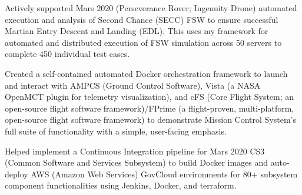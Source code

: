 \documentclass[8pt]{article}
\newenvironment{outerlist}[1][\enskip\textbullet]%
       {\begin{compactenum}[#1]}{\end{compactenum}%
        \vspace{-.3\baselineskip}}
\newenvironment{innerlist}[1][\enskip\textbullet]%
        {\begin{compactenum}[#1]}{\end{compactenum}}
\begin{document}
\begin{outerlist}
\begin{innerlist}
                                \item Actively supported Mars 2020 (Perseverance Rover; Ingenuity Drone) automated execution and analysis of Second Chance (SECC) FSW to ensure
                                successful Martian Entry Descent and Landing (EDL). This uses my framework for automated and distributed execution of FSW simulation
                                across 50 servers to complete 450 individual test cases.

                                \item Created a self-contained automated Docker orchestration framework to launch and interact with AMPCS
                                (Ground Control Software), Vista (a NASA OpenMCT plugin for telemetry visualization), and cFS (Core Flight
                                System; an open-source flight software framework)/FPrime (a flight-proven, multi-platform, open-source flight software framework) to demonstrate Mission Control System's full suite of
                                functionality with a simple, user-facing emphasis.

                                \item Helped implement a Continuous Integration pipeline for Mars 2020 CS3 (Common Software and Services
                                Subsystem) to build Docker images and auto-deploy AWS (Amazon Web Services) GovCloud environments for
                                80+ subsystem component functionalities using Jenkins, Docker, and terraform.\\

                        \end{innerlist}
                \end{outerlist}
\end{document}
